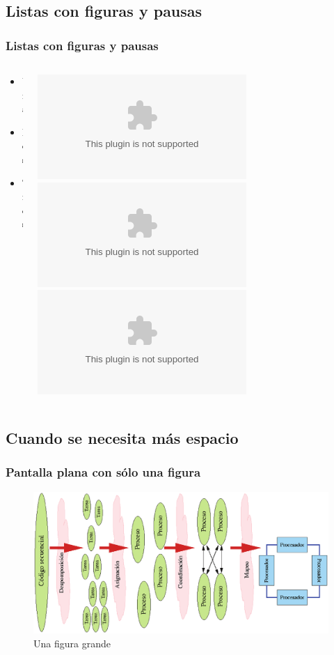 \documentclass{beamer}
\begin{document}
\subsection{Listas con figuras y pausas} 

\begin{frame}
\frametitle{Listas con figuras y pausas}
\begin{columns}
\begin{column}{4cm}
\begin{itemize}
\item<1-> Una
\item<3-> Dos
\item<5-> Tres
\end{itemize}
\vspace{3cm} 
\end{column}
\begin{column}{4cm}
\begin{overprint}
\includegraphics<2>[scale=0.05]{../figuras/logo_usc.eps}
\includegraphics<4>[scale=0.10]{../figuras/logo_usc.eps}
\includegraphics<6>[scale=0.15]{../figuras/logo_usc.eps}
\end{overprint}
\end{column}
\end{columns}
\end{frame}

\subsection{Cuando se necesita más espacio} 
\begin{frame}[plain]
\frametitle{Pantalla plana con sólo una figura}
\begin{figure}
\includegraphics[scale=0.3]{../figuras/figura01.eps} 
\caption{Una figura grande}
\end{figure}
\end{frame}
\end{document}

